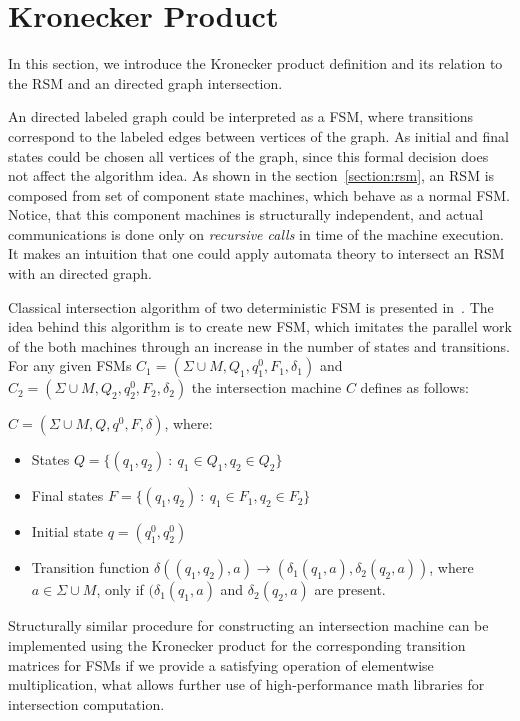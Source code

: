 \section{Kronecker Product}
\label{kronecker:section}

In this section, we introduce the Kronecker product definition and its relation to the RSM and an directed graph intersection.

An directed labeled graph could be interpreted as a FSM, where transitions correspond to the labeled edges between vertices of the graph. 
As initial and final states could be chosen all vertices of the graph, since this formal decision does not affect the algorithm idea.
As shown in the section~\ref{section:rsm}, an RSM is composed from set of component state machines, which behave as a normal FSM. 
Notice, that this component machines is structurally independent, and actual communications is done only on \textit{recursive calls} in time of the machine execution. 
It makes an intuition that one could apply automata theory to intersect an RSM with an directed graph.

Classical intersection algorithm of two deterministic FSM is presented in~\cite{automata:theory:10.5555/1177300}. 
The idea behind this algorithm is to create new FSM, which imitates the parallel work of the both machines through an increase in the number of states and transitions. 
For any given FSMs $C_1 = (\Sigma \cup M,Q_1,q_1^0,F_1,\delta_1)$ and $C_2 = (\Sigma \cup M,Q_2,q_2^0,F_2,\delta_2)$ the intersection machine $C$ defines as follows: 

$C = (\Sigma \cup M, Q, q^0, F, \delta)$, where:

\begin{itemize}
    \item States $Q = \{(q_1,q_2)~:~q_1 \in Q_1, q_2 \in Q_2 \}$
    \item Final states $F = \{(q_1,q_2)~:~q_1 \in F_1, q_2 \in F_2 \}$
    \item Initial state $q = (q_1^0,q_2^0)$
    \item Transition function $\delta ((q_1,q_2),a) \to (\delta_1(q_1,a),\delta_2(q_2,a))$, where $a \in \Sigma \cup M$, only if $(\delta_1(q_1,a)$ and $\delta_2(q_2,a)$ are present.
\end{itemize}

Structurally similar procedure for constructing an intersection machine can be implemented using the Kronecker product for the corresponding transition matrices for FSMs if we provide a satisfying operation of elementwise multiplication, what allows further use of high-performance math libraries for intersection computation.


